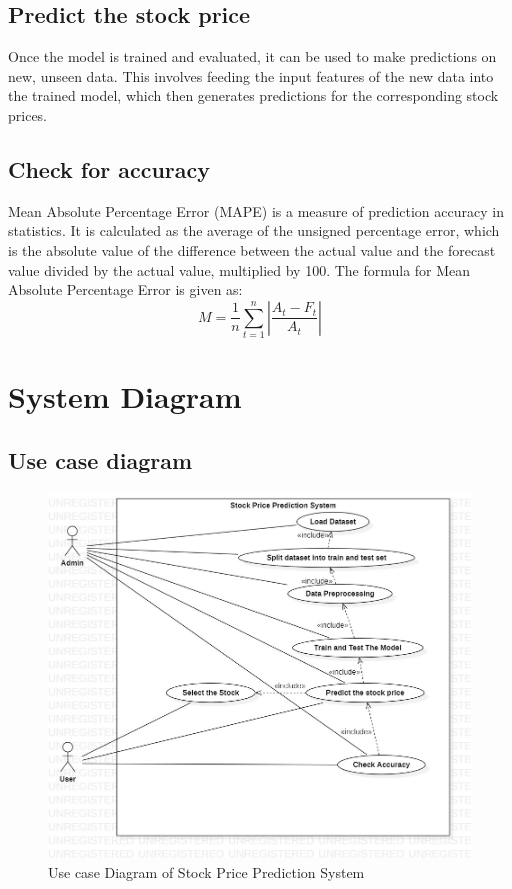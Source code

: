 \subsection{Predict the stock price}
\vspace{-18pt}
Once the model is trained and evaluated, it can be used to make predictions on new, unseen data. This involves feeding the input features of the new data into the trained model, which then generates predictions for the corresponding stock prices.
\subsection{Check for accuracy}
\vspace{-18pt}
Mean Absolute Percentage Error (MAPE) is a measure of prediction accuracy in statistics. It is calculated as the average of the unsigned percentage error, which is the absolute value of the difference between the actual value and the forecast value divided by the actual value, multiplied by 100. The formula for Mean Absolute Percentage Error is given as:
\begin{equation}
M = \frac{1}{n} \sum_{t=1}^{n} | \frac{A_t - F_t}{A_t}|
\end{equation}
\section{System Diagram}
\vspace{-18pt}
\subsection{Use case diagram}
\begin{figure}[h]
\begin{center}
	\includegraphics[width=5in]{images/ucd.jpg} 
	\caption{Use case Diagram of Stock Price Prediction System} %
	\label{Use case Diagram of Stock Price Prediction System} %
\end{center}
\end{figure}
\newpage

